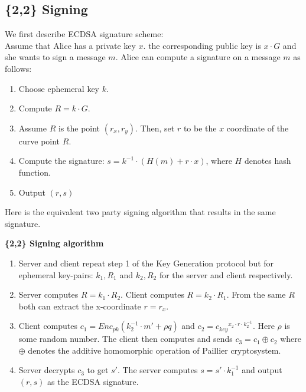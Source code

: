 \documentclass[runningheads]{llncs}
\begin{document}
\subsection{\{2,2\} Signing}
We first describe ECDSA signature scheme: \\
 Assume that Alice has a private key ${x}$. the corresponding public key is ${x \cdot G}$ and she wants to sign a message ${m}$. Alice can compute a signature on a message ${m}$ as follows:
 \begin{enumerate}
 \item Choose ephemeral key ${k}$.
 \item Compute ${R = k \cdot G}$.
 \item Assume ${R}$ is the point ${(r_x, r_y)}$. Then, set ${r}$ to be the ${x}$ coordinate of the curve point ${R}$.
 \item Compute the signature: ${s = k^{-1} \cdot (H(m)+ r\cdot x)}$, where ${H}$ denotes hash function.
 \item Output ${(r,s)}$
 \end{enumerate}
Here is the equivalent two party signing algorithm that results in the same signature.
\begin{mdframed}[userdefinedwidth = 12.3cm]
\textbf{\{2,2\} Signing algorithm}
\begin{enumerate}

\item Server and client repeat step 1 of the Key Generation protocol but for ephemeral key-pairs: ${k_1,R_1}$ and ${k_2,R_2}$ for the server and client respectively.
\item Server computes ${R =k_1 \cdot R_2}$. Client computes ${R = k_2 \cdot R_1}$. From the same ${R}$ both can extract the x-coordinate ${r=r_x}$.
\item Client computes ${c_1=Enc_{pk}(k_2^{-1}\cdot m' + \rho q)}$ and ${c_2={c_{key}}^{x_2\cdot r \cdot k_2^{-1}}}$. Here ${\rho}$ is some random number. The client then computes and sends ${c_3 = c_1 \oplus c_2}$ where ${\oplus}$ denotes the additive homomorphic operation of Paillier cryptosystem.
\item Server decrypts ${c_3}$ to get ${s'}$. The server computes ${s=s'\cdot k_1^{-1}}$ and output ${(r,s)}$ as the ECDSA signature.
\end{enumerate}
\end{mdframed}
\end{document}
